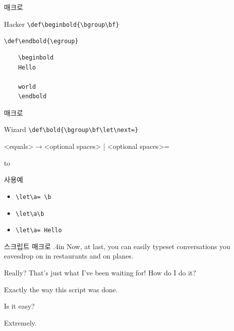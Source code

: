 \documentclass{beamer}
\begin{document}
%
\begin{frame}[fragile]{\texttt{\string\bold} 매크로}
  \begin{alertblock}{Hacker}
    \verb+\def\beginbold{\bgroup\bf}+
    
    \verb+\def\endbold{\egroup}+
  \end{alertblock}

\begin{verbatim}
    \beginbold
    Hello

    world
    \endbold
\end{verbatim}
\end{frame}


%
\begin{frame}[fragile]{\texttt{\string\bold} 매크로}
  \begin{alertblock}{Wizard}
    \verb+\def\bold{\bgroup\bf\let\next=}+
  \end{alertblock}
  \medskip
  <equals>$\rightarrow$<optional spaces> | <optional spaces>=
  
  \hbox to
  \medskip

  \begin{alertblock}{사용예}
    \begin{itemize}
    \item \verb*+\let\a= \b+
    \item \verb*+\let\a\b+
    \item \verb*+\let\a= Hello+
    \end{itemize}
  \end{alertblock}
\end{frame}


%


%
\newcount\spk
\def\beginscript{\bgroup \parindent=0pt \rm \spk=1 \rightskip.4in
  \def\par{\ifnum\spk=1 \endgraf \sl \spk=2 \leftskip.4in \rightskip0in
    \else \endgraf \rm \spk=1 \leftskip0in \rightskip.4in \fi}}
\def\endscript {\egroup}

\begin{frame}[fragile]{스크립트 매크로}
  \hsize 3in
  \beginscript
  Now, at last, you can easily typeset
  conversations you eavesdrop on in
  restaurants and on planes.
  
  Really? That's just what I've been waiting
  for! How do I do it?
  
  Exactly the way this script was done.
  
  Is it easy?
  
  Extremely.
  \endscript
\end{frame}
\end{document}
